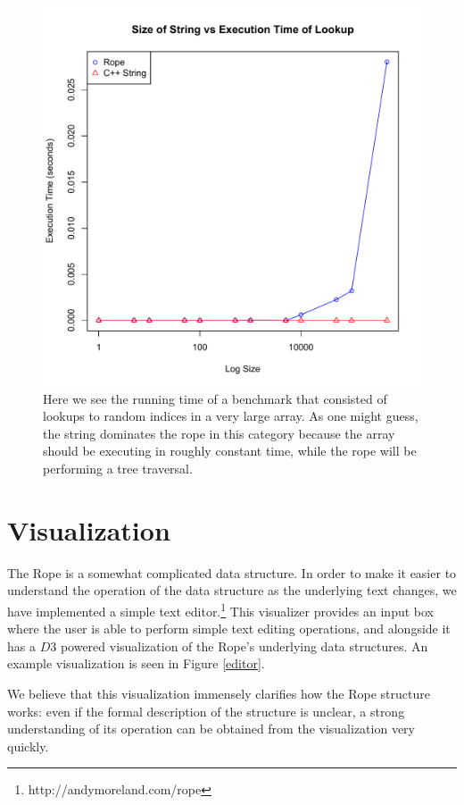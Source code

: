 \documentclass[12pt]{article}
\begin{document}
\begin{figure}[p]
\begin{centering}
\includegraphics[scale=1.0]{size_vs_lookup}
\caption{Here we see the running time of a benchmark that consisted of lookups to random indices in a very large array. As one might guess, the string dominates the rope in this category because the array should be executing in roughly constant time, while the rope will be performing a tree traversal.}
\end{centering}
\end{figure}
\FloatBarrier
\section{Visualization}

The Rope is a somewhat complicated data structure. In order to make it easier to understand the operation of the data structure as the underlying text changes, we have implemented a simple text editor.\footnote{http://andymoreland.com/rope} This visualizer provides an input box where the user is able to perform simple text editing operations, and alongside it has a $D3$ powered visualization of the Rope's underlying data structures. An example visualization is seen in Figure \ref{editor}.

We believe that this visualization immensely clarifies how the Rope structure works: even if the formal description of the structure is unclear, a strong understanding of its operation can be obtained from the visualization very quickly.
\end{document}
